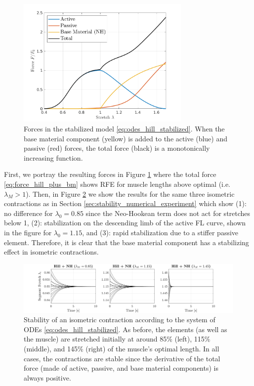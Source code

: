 \documentclass{sfuthesis}
\numberwithin{equation}{section}
\numberwithin{figure}{chapter}
\numberwithin{table}{chapter}
\theoremstyle{definition}
\begin{document}
\begin{figure}
    \centering
    \includegraphics[width=0.75\textwidth]{03_forces_with_bm.png}
    \caption{Forces in the stabilized model \eqref{eq:odes_hill_stabilized}. When the base material component (yellow) is added to the active (blue) and passive (red) forces, the total force (black) is a monotonically increasing function.}
    \label{fig:forces_stabilized}
\end{figure}

First, we portray the resulting forces in Figure \ref{fig:forces_stabilized} where the total force \eqref{eq:force_hill_plus_bm} shows RFE for muscle lengths above optimal (i.e. $\lambda_M > 1$). Then, in Figure \ref{fig:hill_plus_nh_stable} we show the results for the same three isometric contractions as in Section \ref{sec:stability_numerical_experiment} which show (1): no difference for $\lambda_0 = 0.85$ since the Neo-Hookean term does not act for stretches below 1, (2): stabilization on the descending limb of the active FL curve, shown in the figure for $\lambda_0 = 1.15$, and (3): rapid stabilization due to a stiffer passive element. Therefore, it is clear that the base material component has a stabilizing effect in isometric contractions. 

\begin{figure}
    \centering
    \includegraphics[width=\textwidth]{06_with_bm_stable.png}
    \caption{Stability of an isometric contraction according to the system of ODEs \eqref{eq:odes_hill_stabilized}. As before, the elements (as well as the muscle) are stretched initially at around 85\% (left), 115\% (middle), and 145\% (right) of the muscle's optimal length. In all cases, the contractions are stable since the derivative of the total force (made of active, passive, and base material components) is always positive.}
    \label{fig:hill_plus_nh_stable}
\end{figure}
\end{document}
